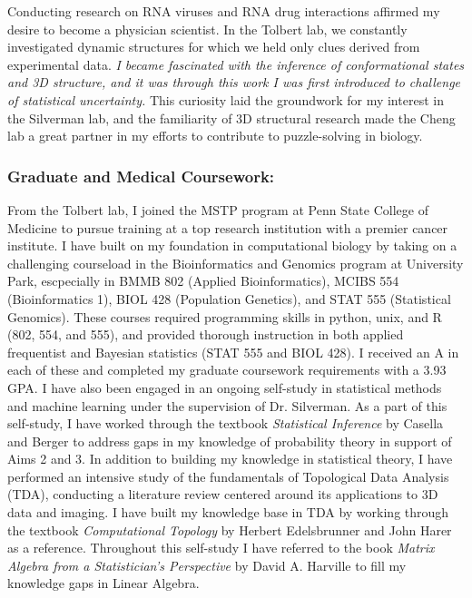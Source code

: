 \documentclass{NIHGrant}
\begin{document}
Conducting research on RNA viruses and RNA drug interactions affirmed my desire to become a physician scientist. In the Tolbert lab, we constantly investigated dynamic structures for which we held only clues derived from experimental data. \emph{I became fascinated with the inference of conformational states and 3D structure, and it was through this work I was first introduced to challenge of statistical uncertainty.} This curiosity laid the groundwork for my interest in the Silverman lab, and the familiarity of 3D structural research made the Cheng lab a great partner in my efforts to contribute to puzzle-solving in biology.

\subsubsection*{Graduate and Medical Coursework:}
From the Tolbert lab, I joined the MSTP program at Penn State College of Medicine to pursue training at a top research institution with a premier cancer institute. I have built on my foundation in computational biology by taking on a challenging courseload in the Bioinformatics and Genomics program at University Park, escpecially in BMMB 802 (Applied Bioinformatics), MCIBS 554 (Bioinformatics 1), BIOL 428 (Population Genetics), and STAT 555 (Statistical Genomics). These courses required programming skills in python, unix, and R (802, 554, and 555), and provided thorough instruction in both applied frequentist and Bayesian statistics (STAT 555 and BIOL 428). I received an A in each of these and completed my graduate coursework requirements with a 3.93 GPA. I have also been engaged in an ongoing self-study in statistical methods and machine learning under the supervision of Dr. Silverman. As a part of this self-study, I have worked through the textbook \textit{Statistical Inference} by Casella and Berger to address gaps in my knowledge of probability theory in support of Aims 2 and 3. In addition to building my knowledge in statistical theory, I have performed an intensive study of the fundamentals of Topological Data Analysis (TDA), conducting a literature review centered around its applications to 3D data and imaging. I have built my knowledge base in TDA by working through the textbook \textit{Computational Topology} by Herbert Edelsbrunner and John Harer as a reference. Throughout this self-study I have referred to the book \textit{Matrix Algebra from a Statistician's Perspective} by David A. Harville to fill my knowledge gaps in Linear Algebra.
\end{document}
